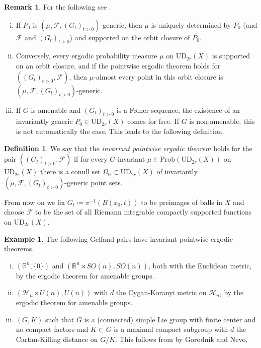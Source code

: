 \documentclass[12pt,reqno,a4paper]{amsart}
\theoremstyle{theorem}
\theoremstyle{definition}
\newtheorem{definition}[theorem]{Definition}
\newtheorem{example}[theorem]{Example}
\newtheorem{remark}[theorem]{Remark}
\numberwithin{theorem}{section}
\numberwithin{equation}{section}
\newcommand{\R}{\mathbb{R}}
\newcommand{\UD}{\mathrm{UD}}
\begin{document}
\begin{remark}
For the following see \cite{HartnickWackenhuthDensity}.
	\begin{enumerate}[(i)]
		\item If $P_0$ is $(\mu, \mathcal{F}, (G_t)_{t>0})$-generic, then $\mu$ is uniquely determined by $P_0$ (and $\mathcal{F}$ and $(G_t)_{t>0}$) and supported on the orbit closure of $P_0$.
		\item Conversely, every ergodic probability measure $\mu$ on $\UD_{2r}(X)$ is supported on an orbit closure, and if the pointwise ergodic theorem holds for $((G_t)_{t>0}, \mathcal{F})$, then $\mu$-almost every point in this orbit closure is $(\mu, \mathcal{F}, (G_t)_{t>0})$-generic.
		\item If $G$ is amenable and $(G_t)_{t>0}$ is a F\o lner sequence, the existence of an invariantly generic $P_0\in \UD_{2r}(X)$ comes for free. 
			If $G$ is non-amenable, this is not automatically the case. This leads to the following definition.
	\end{enumerate}
\end{remark}
\begin{definition}\label{d:invariant_pointwise_ergodic_theorem}
	We say that the \emph{invariant pointwise ergodic theorem} holds for the pair $((G_t)_{t>0}, \mathcal{F})$ if for every $G$-invariant $\mu\in \mathrm{Prob}(\UD_{2r}(X))$ on $\UD_{2r}(X)$ there is a conull set $\Omega_0\subset \UD_{2r}(X)$ of invariantly $(\mu, \mathcal{F}, (G_t)_{t>0})$-generic point sets.
\end{definition}

From now on we fix $G_t\coloneqq \pi^{-1}(B(x_0, t))$ to be preimages of balls in $X$ and choose $\mathcal{F}$ to be the set of all Riemann integrable compactly supported functions on $\UD_{2r}(X)$.

\begin{example}\label{e:Gelfand_pairs_with_invariant_pointwise_ergodic_theorem}
	The following Gelfand pairs have invariant pointwise ergodic theorems.
	\begin{enumerate}[(i)]
		\item $(\R^n, \{0\})$ and $(\R^n\rtimes SO(n), SO(n))$, both with the Euclidean metric, by the ergodic theorem for amenable groups.
		\item $(\mathcal{H}_n\rtimes U(n), U(n))$ with $d$ the Cygan-Koranyi metric on $\mathcal{H}_n$, by the ergodic theorem for amenable groups.
		\item $(G, K)$ such that $G$ is a (connected) simple Lie group with finite center and no compact factors and $K\subset G$ is a maximal compact subgroup with $d$ the Cartan-Killing distance on $G/K$. This follows from \cite[Theorem 1.2.]{GorodnikNevo} by Gorodnik and Nevo.
	\end{enumerate}
\end{example}
\end{document}
